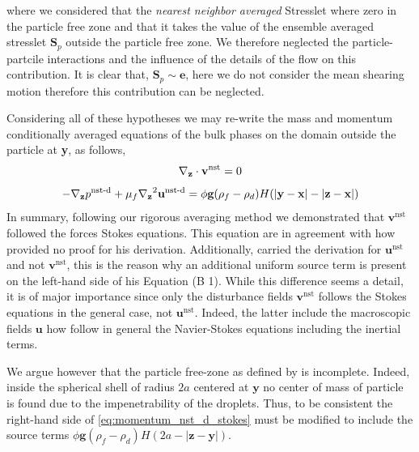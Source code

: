 where we considered that the \textit{nearest neighbor averaged} Stresslet where zero in the particle free zone and that it takes the value of the ensemble averaged stresslet $\textbf{S}_p$ outside the particle free zone.
We therefore neglected the particle-partcile interactions and the influence of the details of the flow on this contribution. 
It is clear that, $\textbf{S}_p \sim \textbf{e}$, here we do not consider the mean shearing motion therefore this contribution can be neglected. 

Considering all of these hypotheses we may re-write the mass and momentum conditionally averaged equations of the bulk phases on the domain outside the particle at \textbf{y}, as follows,
\begin{equation}
    \pddz \cdot \textbf{v}^\text{nst}
    = 0
    \label{eq:mass_nst_d_stokes}
\end{equation}
\begin{equation}
    - \pddz p^\text{nst-d} 
    + \mu_f \pddz^2 \textbf{u}^\text{nst-d}
    = 
    \phi
    \textbf{g}
    (\rho_f - \rho_d) H(|\textbf{y} - \textbf{x}| - |\textbf{z} - \textbf{x}|)
    \label{eq:momentum_nst_d_stokes}
\end{equation}
In summary, following our rigorous averaging method we demonstrated that $\textbf{v}^\text{nst}$ followed the forces Stokes equations. 
This equation are in agreement with \citet{zhang2021ensemble} how provided no proof for his derivation. 
Additionally, \citet{zhang2021ensemble} carried the derivation for $\textbf{u}^\text{nst}$ and not $\textbf{v}^\text{nst}$, this is the reason why an additional uniform source term is present on the left-hand side of his Equation (B 1). 
While this difference seems a detail, it is of major importance since only the disturbance fields $\textbf{v}^\text{nst}$ follows the Stokes equations in the general case, not $\textbf{u}^\text{nst}$. 
Indeed, the latter include the macroscopic fields $\textbf{u}$ how follow in general the Navier-Stokes equations including the inertial terms. 

We argue however that the particle free-zone as defined by \citep{zhang2021ensemble} is incomplete. 
Indeed, inside the spherical shell of radius $2a$ centered at $\textbf{y}$ no center of mass of particle is found due to the impenetrability of the droplets. 
Thus, to be consistent the right-hand side of \ref{eq:momentum_nst_d_stokes} must be modified to include the source terms $\phi
\textbf{g}
(\rho_f - \rho_d) H(2a - |\textbf{z} - \textbf{y}|)$. 



